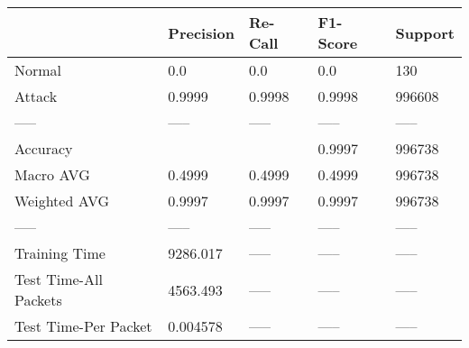 \begin{tabular}{lllll}
\toprule
{} & Precision & Re-Call & F1-Score & Support \\
\midrule
Normal                &       0.0 &     0.0 &      0.0 &     130 \\
Attack                &    0.9999 &  0.9998 &   0.9998 &  996608 \\
-----                 &     ----- &   ----- &    ----- &   ----- \\
Accuracy              &           &         &   0.9997 &  996738 \\
Macro AVG             &    0.4999 &  0.4999 &   0.4999 &  996738 \\
Weighted AVG          &    0.9997 &  0.9997 &   0.9997 &  996738 \\
-----                 &     ----- &   ----- &    ----- &   ----- \\
Training Time         &  9286.017 &   ----- &    ----- &   ----- \\
Test Time-All Packets &  4563.493 &   ----- &    ----- &   ----- \\
Test Time-Per Packet  &  0.004578 &   ----- &    ----- &   ----- \\
\bottomrule
\end{tabular}

